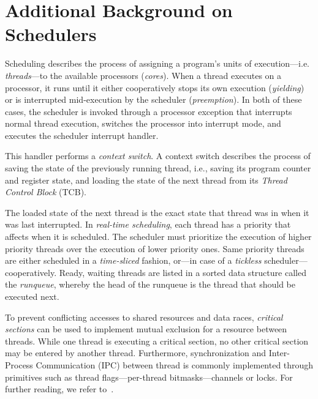 \iffalse
\section{Additional Background on Schedulers}
\label{sec:background}

Scheduling describes the process of assigning a program's units of execution---i.e. \textit{threads}---to the available processors (\emph{cores}).
When a thread executes on a processor, it runs until it either cooperatively stops its own execution (\textit{yielding}) or is interrupted mid-execution by the scheduler (\textit{preemption}).
In both of these cases, the scheduler is invoked through a processor exception that interrupts normal thread execution, switches the processor into interrupt mode, and executes the scheduler interrupt handler.

This handler performs a \textit{context switch}.
A context switch describes the process of saving the state of the previously running thread, i.e., saving its program counter and register state, and loading the state of the next thread from its \textit{Thread Control Block} (TCB).

The loaded state of the next thread is the exact state that thread was in when it was last interrupted.
In \textit{real-time scheduling}, each thread has a priority that affects when it is scheduled.
The scheduler must prioritize the execution of higher priority threads over the execution of lower priority ones.
Same priority threads are either scheduled in a \textit{time-sliced} fashion, or---in case of a \textit{tickless} scheduler---cooperatively.
Ready, waiting threads are listed in a sorted data structure called the \emph{runqueue}, whereby the head of the runqueue is the thread that should be executed next.

To prevent conflicting accesses to shared resources and data races, \emph{critical sections} can be used to implement mutual exclusion for a resource between threads.
While one thread is executing a critical section, no other critical section may be entered by another thread.
Furthermore, synchronization and Inter-Process Communication (IPC) between thread is commonly implemented through primitives such as thread flags---per-thread bitmasks---channels or locks. For further reading, we refer to~\cite{hardrealtime-multiprocessor-survey,Bos2023}.

